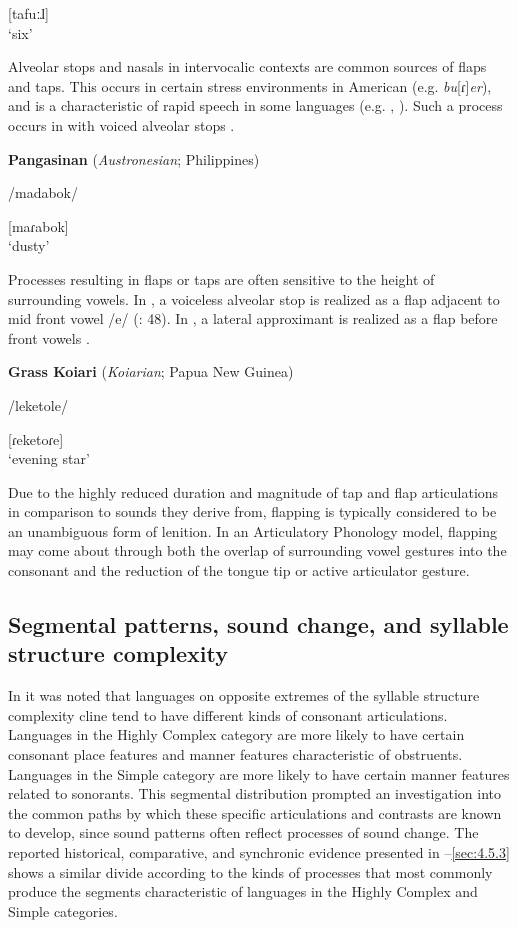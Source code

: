 [tafuːɺ]\\
\glt ‘six’
\citep[45]{Braine1970}
\z

  Alveolar stops and nasals in intervocalic contexts are common sources of flaps and taps. This occurs in certain stress environments in American  (e.g. \textit{bu}[ɾ]\textit{er}), and is a characteristic of rapid speech in some languages (e.g. , \citealt{Sandalo1997}). Such a process occurs in  with voiced alveolar stops .

\ea\label{ex:4.54}
  \textbf{Pangasinan} (\textit{Austronesian}; Philippines)

/madabok/

[maɾabok]\\
\glt ‘dusty’
\citep[18]{Benton1971}
\z

  Processes resulting in flaps or taps are often sensitive to the height of surrounding vowels. In , a voiceless alveolar stop is realized as a flap adjacent to mid front vowel /e/ (\citealt{CunhadeOliveira2005}: 48). In , a lateral approximant is realized as a flap before front vowels .

\ea\label{ex:4.55}
  \textbf{Grass Koiari} (\textit{Koiarian}; Papua New Guinea)

/leketole/

[ɾeketoɾe]\\
\glt ‘evening star’
\citep[6]{Dutton1996}
\z

  Due to the highly reduced duration and magnitude of tap and flap articulations in comparison to sounds they derive from, flapping is typically considered to be an unambiguous form of lenition. In an Articulatory Phonology model, flapping may come about through both the overlap of surrounding vowel gestures into the consonant and the reduction of the tongue tip or active articulator gesture. 

\subsection{Segmental patterns, sound change, and syllable structure complexity}\label{sec:4.5.4}

  In  it was noted that languages on opposite extremes of the syllable structure complexity cline tend to have different kinds of consonant articulations. Languages in the Highly Complex category are more likely to have certain consonant place features and manner features characteristic of obstruents. Languages in the Simple category are more likely to have certain manner features related to sonorants. This segmental distribution prompted an investigation into the common paths by which these specific articulations and contrasts are known to develop, since sound patterns often reflect processes of sound change. The reported historical, comparative, and synchronic evidence presented in --\ref{sec:4.5.3} shows a similar divide according to the kinds of processes that most commonly produce the segments characteristic of languages in the Highly Complex and Simple categories.

